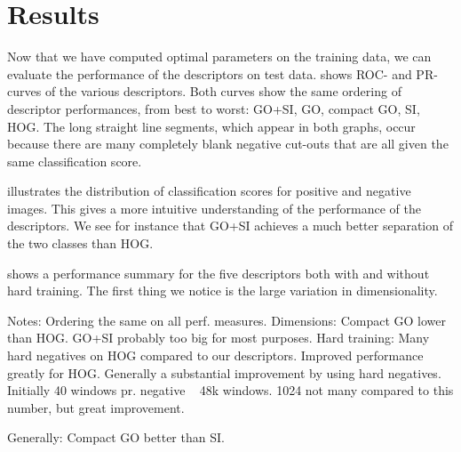 \documentclass[thesis.tex]{subfiles}
\begin{document}
\section{Results}
%
Now that we have computed optimal parameters on the training data, we can evaluate the performance of the descriptors on test data.  shows ROC- and PR-curves of the various descriptors. Both curves show the same ordering of descriptor performances, from best to worst: GO+SI, GO, compact GO, SI, HOG. The long straight line segments, which appear in both graphs, occur because there are many completely blank negative cut-outs that are all given the same classification score.

 illustrates the distribution of classification scores for positive and negative images. This gives a more intuitive understanding of the performance of the descriptors. We see for instance that GO+SI achieves a much better separation of the two classes than HOG.

 shows a performance summary for the five descriptors both with and without hard training. The first thing we notice is the large variation in dimensionality.
%


Notes: Ordering the same on all perf. measures.
Dimensions: Compact GO lower than HOG. GO+SI probably too big for most purposes.
Hard training: Many hard negatives on HOG compared to our descriptors. Improved performance greatly for HOG. Generally a substantial improvement by using hard negatives. Initially 40 windows pr. negative ~ 48k windows. 1024 not many compared to this number, but great improvement.

Generally: Compact GO better than SI.
\end{document}

